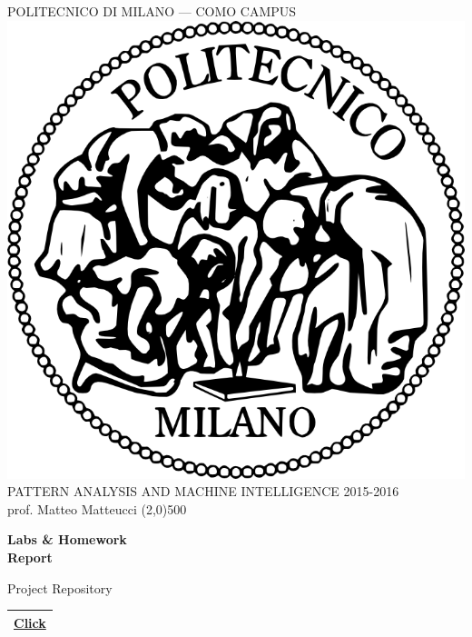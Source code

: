 \documentclass[a4paper,12pt,titlepage]{article} %
\begin{document}
\begin{titlepage}

\begin{center}
	POLITECNICO DI MILANO --- COMO CAMPUS\\
	\vspace{10pt}
	\includegraphics[scale=0.1]{logo-polimi.png}\\
	\vspace{10pt}
	PATTERN ANALYSIS AND MACHINE INTELLIGENCE 2015-2016\\
	prof. Matteo Matteucci	
	\line(2,0){500}
\end{center}

\vspace{60pt}

\begin{center}
	{\Huge \textbf{Labs \& Homework}}\\
	\vspace{20pt}	
	{\Huge \textbf{Report}}\\
\end{center}

\vspace{60pt}

\begin{center}
	{\large Project Repository}
\end{center}
\begin{tabularx}{\textwidth}{|X|}
	\hline
	\href{https://github.com/attillax/PAMI-2015}{Click}\\
	\hline
\end{tabularx}


\end{titlepage}
\end{document}

